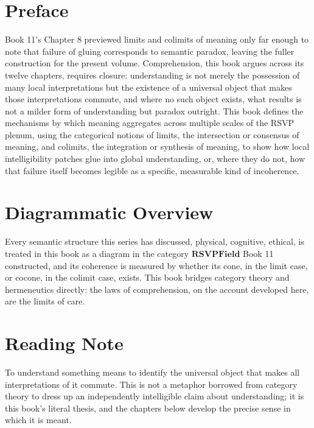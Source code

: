 \chapter*{Preface}

Book 11's Chapter 8 previewed limits and colimits of meaning only far enough to note that failure of gluing corresponds to semantic paradox, leaving the fuller construction for the present volume. Comprehension, this book argues across its twelve chapters, requires closure: understanding is not merely the possession of many local interpretations but the existence of a universal object that makes those interpretations commute, and where no such object exists, what results is not a milder form of understanding but paradox outright. This book defines the mechanisms by which meaning aggregates across multiple scales of the RSVP plenum, using the categorical notions of limits, the intersection or consensus of meaning, and colimits, the integration or synthesis of meaning, to show how local intelligibility patches glue into global understanding, or, where they do not, how that failure itself becomes legible as a specific, measurable kind of incoherence.

\chapter*{Diagrammatic Overview}

Every semantic structure this series has discussed, physical, cognitive, ethical, is treated in this book as a diagram in the category $\mathbf{RSVPField}$ Book 11 constructed, and its coherence is measured by whether its cone, in the limit case, or cocone, in the colimit case, exists. This book bridges category theory and hermeneutics directly: the laws of comprehension, on the account developed here, are the limits of care.

\chapter*{Reading Note}

To understand something means to identify the universal object that makes all interpretations of it commute. This is not a metaphor borrowed from category theory to dress up an independently intelligible claim about understanding; it is this book's literal thesis, and the chapters below develop the precise sense in which it is meant.

